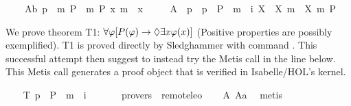 \begin{isabellebody}
\ \ \ \ A{}b{\isacharcolon}\ {\isachardoublequoteopen}{\isacharbrackleft}{\isasymforall}p\ {\isacharparenleft}{\isasymlambda}{\isasymPhi}{\isachardot}\ m{\isasymnot}\ {\isacharparenleft}P\ {\isasymPhi}{\isacharparenright}\ m{\isasymRightarrow}\ P\ {\isacharparenleft}{\isasymlambda}x{\isachardot}\ m{\isasymnot}\ {\isacharparenleft}{\isasymPhi}\ x{\isacharparenright}{\isacharparenright}{\isacharparenright}{\isacharbrackright}{\isachardoublequoteclose}\ \isanewline
\ \ \ \ A{}{\isacharcolon}\ \ {\isachardoublequoteopen}{\isacharbrackleft}{\isasymforall}p\ {\isacharparenleft}{\isasymlambda}{\isasymPhi}{\isachardot}\ {\isasymforall}p\ {\isacharparenleft}{\isasymlambda}{\isasympsi}{\isachardot}\ {\isacharparenleft}P\ {\isasymPhi}\ m{\isasymand}\ {\isasymbox}\ {\isacharparenleft}{\isasymforall}i\ {\isacharparenleft}{\isasymlambda}X{\isachardot}\ {\isasymPhi}\ X\ m{\isasymRightarrow}\ {\isasympsi}\ X{\isacharparenright}{\isacharparenright}{\isacharparenright}\ m{\isasymRightarrow}\ P\ {\isasympsi}{\isacharparenright}{\isacharparenright}{\isacharbrackright}{\isachardoublequoteclose}%
\begin{isamarkuptext}%
We prove theorem T1: $\forall \varphi [P(\varphi) \rightarrow \Diamond \exists x \varphi(x)]$ (Positive 
properties are possibly exemplified). T1 is proved directly by Sledghammer with command . This successful attempt then suggest to 
instead try the Metis call in the line below. This Metis call generates a proof object that is 
verified in Isabelle/HOL's kernel.%
\end{isamarkuptext}%
\isamarkuptrue%
\ \ \isamarkupfalse%
\ T{}{\isacharcolon}\ {\isachardoublequoteopen}{\isacharbrackleft}{\isasymforall}p\ {\isacharparenleft}{\isasymlambda}{\isasymPhi}{\isachardot}\ P\ {\isasymPhi}\ m{\isasymRightarrow}\ {\isasymdiamond}\ {\isacharparenleft}{\isasymexists}i\ {\isasymPhi}{\isacharparenright}{\isacharparenright}{\isacharbrackright}{\isachardoublequoteclose}\ \ \isanewline
\ \ \isamarkupfalse%
\ {\isacharbrackleft}provers\ {\isacharequal}\ remote{\isacharunderscore}leo{}{\isacharbrackright}\isanewline
%
\isadelimproof
\ \ %
\endisadelimproof
%
\isatagproof
{}\isamarkupfalse%
\ A{}\ A{}a\ \isamarkupfalse%
\ metis%
\endisatagproof
{\isafoldproof}%
%
\isadelimproof
%
\endisadelimproof
%

\end{isabellebody}
